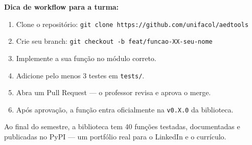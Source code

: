 \begin{TipBox}
\textbf{Dica de workflow para a turma:}
\begin{enumerate}[leftmargin=*]
  \item Clone o repositório: \texttt{git clone https://github.com/unifacol/aedtools}
  \item Crie seu branch: \texttt{git checkout -b feat/funcao-XX-seu-nome}
  \item Implemente a sua função no módulo correto.
  \item Adicione pelo menos 3 testes em \texttt{tests/}.
  \item Abra um Pull Request — o professor revisa e aprova o merge.
  \item Após aprovação, a função entra oficialmente na \texttt{v0.X.0} da biblioteca.
\end{enumerate}
Ao final do semestre, a biblioteca tem 40 funções testadas, documentadas e
publicadas no PyPI — um portfólio real para o LinkedIn e o currículo.
\end{TipBox}
